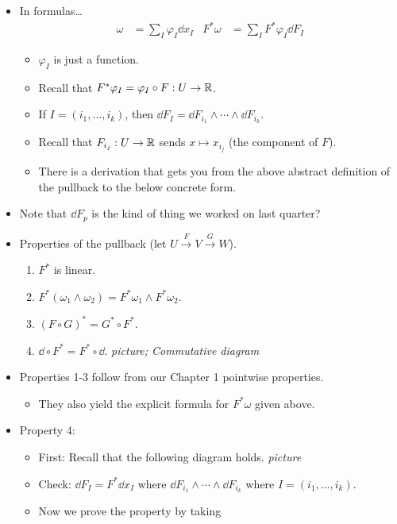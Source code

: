 \documentclass[../notes.tex]{subfiles}
\begin{document}
\begin{itemize}
    \item In formulas\dots
    \begin{align*}
        \omega &= \sum_I\varphi_I\dd{x_I}&
        F^*\omega &= \sum_IF^*\varphi_I\dd{F_I}
    \end{align*}
    \begin{itemize}
        \item $\varphi_I$ is just a function.
        \item Recall that $F^*\varphi_I=\varphi_I\circ F:U\to\mathbb{R}$.
        \item If $I=(i_1,\dots,i_k)$, then $\dd{F_I}=\dd{F_{i_1}}\wedge\cdots\wedge\dd{F_{i_k}}$.
        \item Recall that $F_{i_j}:U\to\mathbb{R}$ sends $x\mapsto x_{i_j}$ (the component of $F$).
        \item There is a derivation that gets you from the above abstract definition of the pullback to the below concrete form.
    \end{itemize}
    \item Note that $\dd{F_p}$ is the kind of thing we worked on last quarter?
    \item Properties of the pullback (let $U\xrightarrow{F}V\xrightarrow{G}W$).
    \begin{enumerate}
        \item $F^*$ is linear.
        \item $F^*(\omega_1\wedge\omega_2)=F^*\omega_1\wedge F^*\omega_2$.
        \item $(F\circ G)^*=G^*\circ F^*$.
        \item $\dd\circ F^*=F^*\circ\dd$.
        \emph{picture; Commutative diagram}
    \end{enumerate}
    \item Properties 1-3 follow from our Chapter 1 pointwise properties.
    \begin{itemize}
        \item They also yield the explicit formula for $F^*\omega$ given above.
    \end{itemize}
    \item Property 4:
    \begin{itemize}
        \item First: Recall that the following diagram holds.
        \emph{picture}
        \item Check: $\dd{F_I}=F^*\dd{x_I}$ where $\dd{F_{i_1}}\wedge\cdots\wedge\dd{F_{i_k}}$ where $I=(i_1,\dots,i_k)$.
        \item Now we prove the property by taking

\end{itemize}
\end{itemize}
\end{document}

